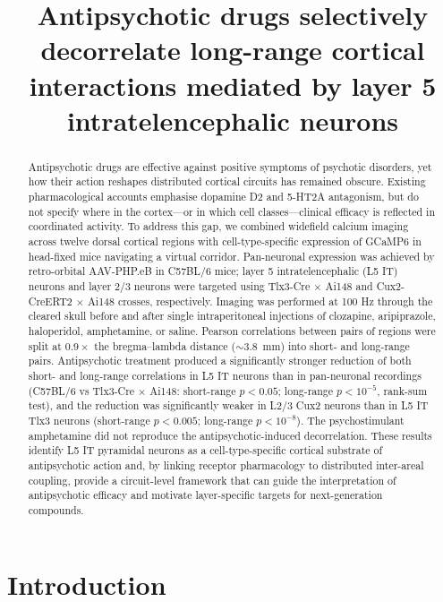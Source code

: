 \documentclass[11pt]{article}
\title{Antipsychotic drugs selectively decorrelate long-range cortical interactions mediated by layer 5 intratelencephalic neurons}
\author{}
\date{}
\begin{document}
\maketitle

\begin{abstract}
Antipsychotic drugs are effective against positive symptoms of psychotic disorders, yet how their action reshapes distributed cortical circuits has remained obscure. Existing pharmacological accounts emphasise dopamine D2 and 5-HT2A antagonism, but do not specify where in the cortex---or in which cell classes---clinical efficacy is reflected in coordinated activity. To address this gap, we combined widefield calcium imaging across twelve dorsal cortical regions with cell-type-specific expression of GCaMP6 in head-fixed mice navigating a virtual corridor. Pan-neuronal expression was achieved by retro-orbital AAV-PHP.eB in C57BL/6 mice; layer 5 intratelencephalic (L5 IT) neurons and layer 2/3 neurons were targeted using Tlx3-Cre $\times$ Ai148 and Cux2-CreERT2 $\times$ Ai148 crosses, respectively. Imaging was performed at 100 Hz through the cleared skull before and after single intraperitoneal injections of clozapine, aripiprazole, haloperidol, amphetamine, or saline. Pearson correlations between pairs of regions were split at $0.9\times$ the bregma--lambda distance (${\sim}3.8$~mm) into short- and long-range pairs. Antipsychotic treatment produced a significantly stronger reduction of both short- and long-range correlations in L5 IT neurons than in pan-neuronal recordings (C57BL/6 vs Tlx3-Cre $\times$ Ai148: short-range $p<0.05$; long-range $p<10^{-5}$, rank-sum test), and the reduction was significantly weaker in L2/3 Cux2 neurons than in L5 IT Tlx3 neurons (short-range $p<0.005$; long-range $p<10^{-8}$). The psychostimulant amphetamine did not reproduce the antipsychotic-induced decorrelation. These results identify L5 IT pyramidal neurons as a cell-type-specific cortical substrate of antipsychotic action and, by linking receptor pharmacology to distributed inter-areal coupling, provide a circuit-level framework that can guide the interpretation of antipsychotic efficacy and motivate layer-specific targets for next-generation compounds.
\end{abstract}

\section{Introduction}
\end{document}
